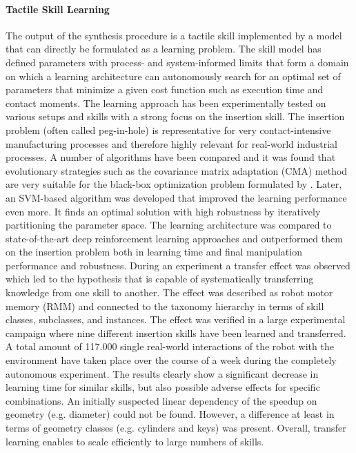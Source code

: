 \paragraph{Tactile Skill Learning}
The output of the synthesis procedure is a tactile skill implemented by a \skillmodelabbr{} model that can directly be formulated as a learning problem.
The skill model has defined parameters with process- and system-informed limits that form a domain on which a learning architecture can autonomously search for an optimal set of parameters that minimize a given cost function such as execution time and contact moments.
The learning approach has been experimentally tested on various setups and skills with a strong focus on the insertion skill.
The insertion problem (often called peg-in-hole) is representative for very contact-intensive manufacturing processes and therefore highly relevant for real-world industrial processes.
A number of algorithms have been compared and it was found that evolutionary strategies such as the covariance matrix adaptation (CMA) method are very suitable for the black-box optimization problem formulated by \skillmodelabbr{}.
Later, an SVM-based algorithm was developed that improved the learning performance even more.
It finds an optimal solution with high robustness by iteratively partitioning the parameter space.
The learning architecture was compared to state-of-the-art deep reinforcement learning approaches and outperformed them on the insertion problem both in learning time and final manipulation performance and robustness.
During an experiment a transfer effect was observed which led to the hypothesis that \skillmodelabbr{} is capable of systematically transferring knowledge from one skill to another.
The effect was described as robot motor memory (RMM) and connected to the taxonomy hierarchy in terms of skill classes, subclasses, and instances.
The effect was verified in a large experimental campaign where nine different insertion skills have been learned and transferred.
A total amount of 117.000 single real-world interactions of the robot with the environment have taken place over the course of a week during the completely autonomous experiment.
The results clearly show a significant decrease in learning time for similar skills, but also possible adverse effects for specific combinations.
An initially suspected linear dependency of the speedup on geometry (e.g. diameter) could not be found. However, a difference at least in terms of geometry classes (e.g. cylinders and keys) was present.
Overall, transfer learning enables \skillmodelabbr{} to scale efficiently to large numbers of skills.

